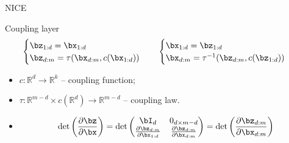 \begin{frame}{NICE}
	\begin{block}{Coupling layer}
		\begin{equation*}
			\begin{cases} \bz_{1:d} = \bx_{1:d} \\ \bz_{d:m} = \tau (\bx_{d:m}, c(\bx_{1:d}))\end{cases} \quad 
			\begin{cases} \bx_{1:d} = \bz_{1:d} \\ \bx_{d:m} = \tau^{-1} (\bz_{d:m}, c(\bz_{1:d}))\end{cases}
		\end{equation*}
		\begin{itemize}
			\item $c: \mathbb{R}^d \rightarrow \mathbb{R}^{k}$ -- coupling function;
			\item $\tau : \mathbb{R}^{m - d} \times c(\mathbb{R}^d) \rightarrow \mathbb{R}^{m - d}$ -- coupling law.
			\item 
			\[
			\det \left( \frac{\partial \bz}{\partial \bx} \right) = \det 
			\begin{pmatrix}
				\bI_d & 0_{d \times m - d} \\
				\frac{\partial \bz_{d:m}}{\partial \bx_{1:d}} & \frac{\partial \bz_{d:m}}{\partial \bx_{d:m}}
			\end{pmatrix} = 
			\det \left( \frac{\partial \bz_{d:m}}{\partial \bx_{d:m}} \right)
			\]
		\end{itemize}
	\end{block}
\end{frame}

